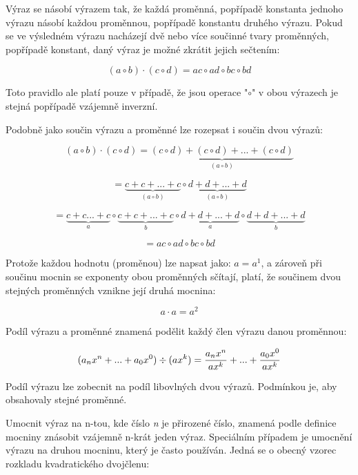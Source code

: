 
Výraz se násobí výrazem tak, že každá proměnná, popřípadě konstanta jednoho výrazu násobí každou proměnnou, popřípadě konstantu druhého výrazu. Pokud se ve výsledném výrazu nacházejí dvě nebo více součinné tvary proměnných, popřípadě konstant, daný výraz je možné zkrátit jejich sečtením:

$$ (a \circ b) \cdot (c \circ d) = ac \circ ad \circ bc \circ bd $$

Toto pravidlo ale platí pouze v případě, že jsou operace "$\circ$" v obou výrazech je stejná popřípadě vzájemně inverzní.

Podobně jako součin výrazu a proměnné lze rozepsat i součin dvou výrazů:

$$(a \circ b) \cdot (c \circ d) = \underbrace{(c \circ d) + (c \circ d) + ... + (c \circ d)}_{(a \circ b)} $$

$$ = \underbrace{c + c + ...+c}_{(a \circ b)} \circ \underbrace{d + d + ... +d }_{(a \circ b)} $$

$$ = \underbrace{c + c ... +c}_{a} \circ \underbrace{c + c + ... +c}_{b} \circ \underbrace{d + d + ... +d}_{a} \circ \underbrace{d+d+...+d}_b $$

$$ = ac \circ ad \circ bc \circ bd $$

Protože každou hodnotu (proměnou) lze napsat jako: $a = a^1$, a zároveň při součinu mocnin se exponenty obou proměnných sčítají, platí, že součinem dvou stejných proměnných vznikne její druhá mocnina:

$$ a\cdot a = a^2 $$


Podíl výrazu a proměnné znamená podělit každý člen výrazu danou proměnnou:

$$ (a_{n}x^{n}+...+a_0x^{0}) \div (ax^{k}) = {{a_nx^{n}}\over{ax^{k}}}+...+{{a_{0}x^{0}}\over{ax^{k}}} $$


Podíl výrazu lze zobecnit na podíl libovlných dvou výrazů. Podmínkou je, aby obsahovaly stejné proměnné.


Umocnit výraz na n-tou, kde číslo {\it n} je přirozené číslo, znamená podle definice mocniny znásobit vzájemně n-krát jeden výraz. Speciálním případem je umocnění výrazu na druhou mocninu, který je často používán. Jedná se o obecný vzorec rozkladu kvadratického dvojčlenu:

